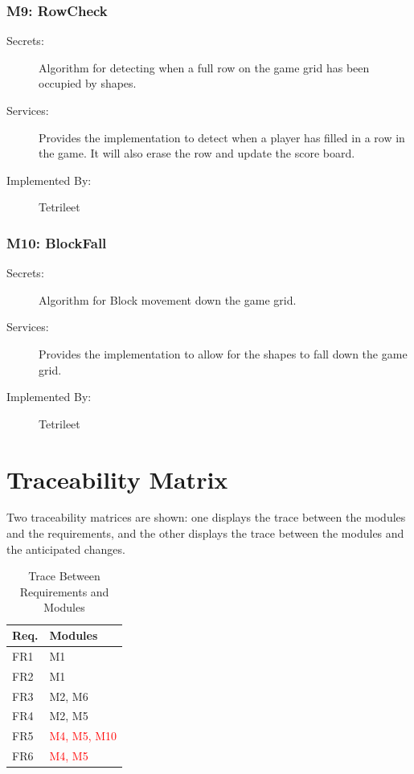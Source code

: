 \documentclass[12pt, titlepage]{article}
\begin{document}
\subsubsection{M9: RowCheck}

\begin{description}
\item[Secrets:]Algorithm for detecting when a full row on the game grid has been occupied by shapes.
\item[Services:] Provides the implementation to detect when a player has filled in a row in the game. It will also erase the row and update the score board.
\item[Implemented By:] Tetrileet 
\end{description}

\subsubsection{M10: BlockFall}

\begin{description}
\item[Secrets:]Algorithm for Block movement down the game grid.
\item[Services:]Provides the implementation to allow for the shapes to fall down the game grid.
\item[Implemented By:] Tetrileet
\end{description}


\section{Traceability Matrix} \label{SecTM}

Two traceability matrices are shown:
one displays the trace between the modules and the
requirements, and the other displays the trace between the modules and the anticipated changes.

\begin{table}[H]
\centering
\begin{tabular}{p{} p{}}
\toprule
\textbf{Req.} & \textbf{Modules}\\
\midrule
FR1 & M1\\
FR2 & M1\\
FR3 & M2, M6\\
FR4 & M2, M5\\
FR5 & \textcolor{red}{M4, M5, M10}\\
FR6 & \textcolor{red}{M4, M5}\\
\bottomrule
\end{tabular}
\caption{Trace Between Requirements and Modules}
\label{TblRT}
\end{table}
\end{document}
